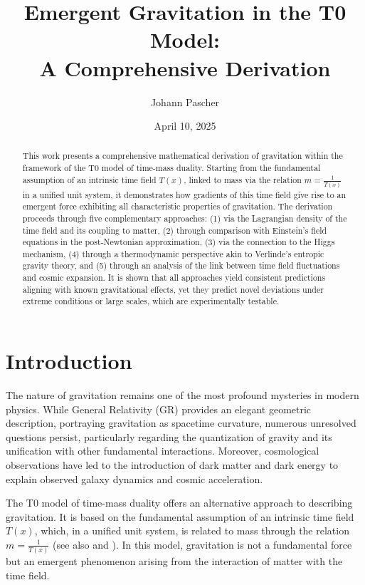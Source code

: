 \documentclass[12pt,a4paper]{article}
\title{Emergent Gravitation in the T0 Model: \\A Comprehensive Derivation}
\author{Johann Pascher}
\date{April 10, 2025}
\newcommand{\Tfield}{T(x)}
\begin{document}
	
	\maketitle
	
	\begin{abstract}
		This work presents a comprehensive mathematical derivation of gravitation within the framework of the T0 model of time-mass duality. Starting from the fundamental assumption of an intrinsic time field \(\Tfield\), linked to mass via the relation \(m = \frac{1}{\Tfield}\) in a unified unit system, it demonstrates how gradients of this time field give rise to an emergent force exhibiting all characteristic properties of gravitation. The derivation proceeds through five complementary approaches: (1) via the Lagrangian density of the time field and its coupling to matter, (2) through comparison with Einstein's field equations in the post-Newtonian approximation, (3) via the connection to the Higgs mechanism, (4) through a thermodynamic perspective akin to Verlinde's entropic gravity theory, and (5) through an analysis of the link between time field fluctuations and cosmic expansion. It is shown that all approaches yield consistent predictions aligning with known gravitational effects, yet they predict novel deviations under extreme conditions or large scales, which are experimentally testable.
	\end{abstract}
	
	\tableofcontents
	\newpage
	
	\section{Introduction}
	\label{sec:introduction}
	The nature of gravitation remains one of the most profound mysteries in modern physics. While General Relativity (GR) provides an elegant geometric description, portraying gravitation as spacetime curvature, numerous unresolved questions persist, particularly regarding the quantization of gravity and its unification with other fundamental interactions. Moreover, cosmological observations have led to the introduction of dark matter and dark energy to explain observed galaxy dynamics and cosmic acceleration.
	
	The T0 model of time-mass duality \cite{pascher_galaxies_2025} offers an alternative approach to describing gravitation. It is based on the fundamental assumption of an intrinsic time field \(\Tfield\), which, in a unified unit system, is related to mass through the relation \(m = \frac{1}{\Tfield}\) (see also \cite{pascher_zeit_2025} and \cite{pascher_higgs_2025}). In this model, gravitation is not a fundamental force but an emergent phenomenon arising from the interaction of matter with the time field.
	
\end{document}
